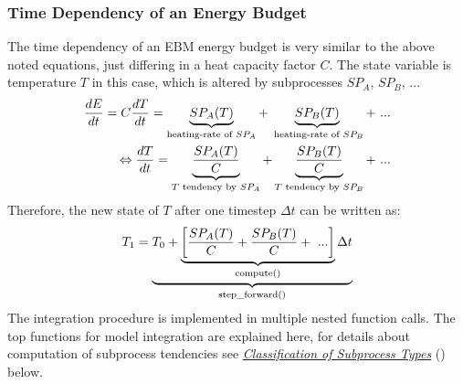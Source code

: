 \documentclass[a4paper,10pt,english]{sphinxmanual}
\begin{document}
\subsubsection{Time Dependency of an Energy Budget}
\label{architecture:time-dependency-of-an-energy-budget}
The time dependency of an EBM energy budget is very similar to the above noted equations, just differing in a heat capacity factor \(C\). The state variable is temperature \(T\) in this case, which is altered by subprocesses \(SP_A\), \(SP_B\), ...
\begin{gather}
\begin{split}\frac{dE}{dt} = C \frac{dT}{dt} = \underbrace{SP_A(T)}_{\textrm{heating-rate of }SP_A} + \underbrace{SP_B(T)}_{\textrm{ heating-rate of }SP_B} + \ ...                          \\
\Leftrightarrow   \frac{dT}{dt} = \underbrace{\frac{SP_A(T)}{C}}_{T \textrm{ tendency by }SP_A} + \underbrace{\frac{SP_B(T)}{C}}_{T \textrm{ tendency by }SP_B} + \ ...\end{split}\notag
\end{gather}
Therefore, the new state of \(T\) after one timestep \(\Delta t\) can be written as:
\begin{gather}
\begin{split}T_1 = \underbrace{T_0 + \underbrace{ \left[ \frac{SP_A(T)}{C} + \frac{SP_B(T)}{C} + \ ... \right]}_{\textrm{compute()}}  \Delta t }_{\textrm{step\_forward()}}\end{split}\notag
\end{gather}
The integration procedure is implemented in multiple nested function calls. The top functions for model integration are explained here, for details about computation of subprocess tendencies see {\hyperref[architecture:classification\string-of\string-subprocess\string-types]{\emph{Classification of Subprocess Types}}} () below.
\end{document}
